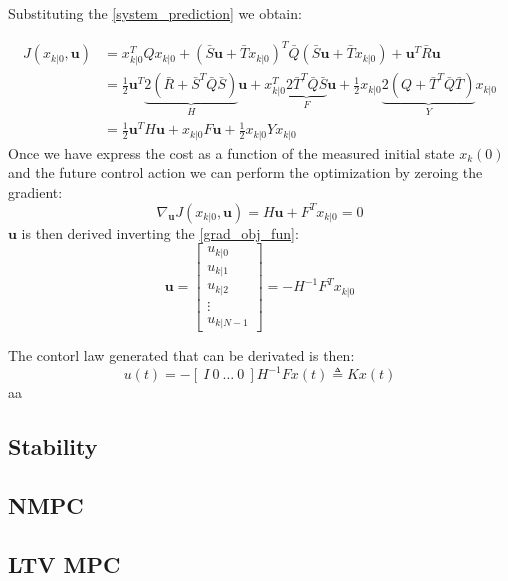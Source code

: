 Substituting the \ref{system_prediction} we obtain:

\begin{equation}
\begin{split} 
 J(x_{k|0},\textbf{u})&=x_{k|0}^T Q x_{k|0} + (\bar{S}\textbf{u}+\bar{T}x_{k|0})^T\bar{Q}(\bar{S}\textbf{u}+\bar{T}x_{k|0}) + \textbf{u}^T\bar{R}\textbf{u} \\ 
 &= \frac{1}{2}\textbf{u}^T \underbrace{2(\bar{R}+\bar{S}^T\bar{Q}\bar{S})}_{H}\textbf{u} + x_{k|0}^T\underbrace{2\bar{T}^T\bar{Q}\bar{S}}_{F}\textbf{u}+\frac{1}{2}x_{k|0}\underbrace{2(Q+\bar{T}^T\bar{Q}\bar{T})}_{Y}x_{k|0} \\
 &=\frac{1}{2}\textbf{u}^TH\textbf{u}+x_{k|0}F\textbf{u}+\frac{1}{2}x_{k|0}Yx_{k|0}
 \end{split}
\end{equation}
Once we have express the cost as a function of the measured initial state $x_k(0)$ and the future control action we can perform the optimization by zeroing the gradient:
\begin{equation}
	\nabla_\textbf{u}J(x_{k|0},\textbf{u})=H\textbf{u}+F^Tx_{k|0}=0
\end{equation}
\label{grad_obj_fun}
$\textbf{u}$ is then derived inverting the \ref{grad_obj_fun}:
\begin{equation*}
	\textbf{u}= \left[
	\begin{matrix}
			u_{k|0} \\ u_{k|1} \\ u_{k|2} \\ \vdots \\ u_{k|N-1}
	\end{matrix}\right] = -H^{-1}F^Tx_{k|0}
\end{equation*} 

The contorl law generated that can be derivated is then:
\begin{equation}
u(t)=-\left[\ I\ 0\ \dots\  0\ \right]H^{-1}Fx(t)\triangleq Kx(t)
\end{equation}
aa

 


\subsection{Stability}
\subsection{NMPC}
\subsection{LTV MPC} %
